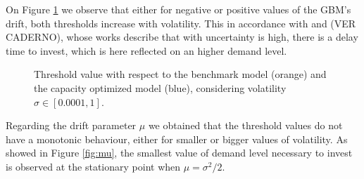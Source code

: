 On Figure \ref{fig:sigm} we observe that either for negative or positive values of the GBM's drift, both thresholds increase with volatility. This in accordance with \cite{rita} and \cite{hagspiel:cap} (VER CADERNO), whose works describe that with uncertainty is high, there is a delay time to invest, which is here reflected on an higher demand level.

\begin{figure}[!htb]
	\begin{subfigmatrix}{2}
			\end{subfigmatrix}
			\caption{Threshold value with respect to the benchmark model (orange) and the capacity optimized model (blue), considering volatility $\sigma \in [0.0001, 1]$.}
			\label{fig:sigm}
\end{figure}

Regarding the drift parameter $\mu$ we obtained that the threshold values do not have a monotonic behaviour, either for smaller or bigger values of volatility. As showed in Figure \ref{fig:mu}, the smallest value of demand level necessary to invest is observed at the stationary point when $\mu=\sigma^2/2$.

